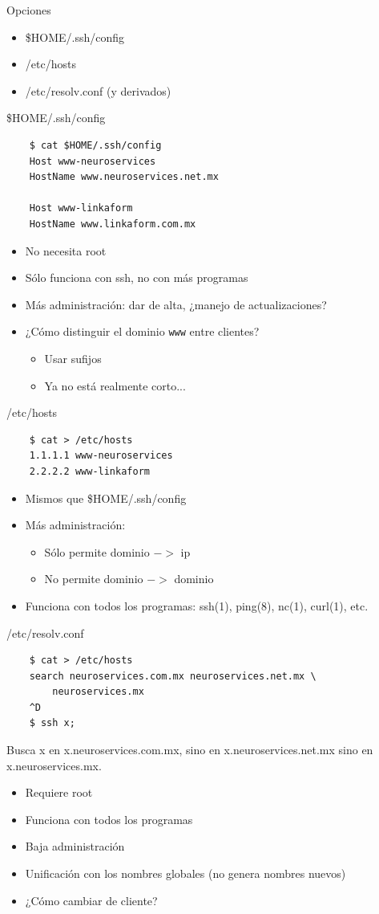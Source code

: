 \documentclass[11pt,spanish]{article}
\newcommand{\rowsp}[1][1em]{\vspace{#1}}
\newcommand{\hone}[1]{{\rowsp[0.3em]\noindent\Large #1 \rowsp[0.3em]}}
\newcommand{\myitm}[1]{\begin{itemize}#1\end{itemize}}
\newcommand{\pros}{\item[pros:]}
\newcommand{\cons}{\item[cons:]}
\begin{document}
\newpage %

\hone{Opciones}

\myitm{
	\item \$HOME/.ssh/config
	\item /etc/hosts
	\item /etc/resolv.conf (y derivados)
}

\newpage %

\hone{\$HOME/.ssh/config}

\begin{lstlisting}
	$ cat $HOME/.ssh/config
	Host www-neuroservices
	HostName www.neuroservices.net.mx

	Host www-linkaform
	HostName www.linkaform.com.mx
\end{lstlisting}

\myitm{
	\pros No necesita root
	\cons Sólo funciona con ssh, no con más programas
	\cons Más administración: dar de alta, ¿manejo de actualizaciones?
	\cons ¿Cómo distinguir el dominio \lstinline{www} entre clientes?
	\myitm{
		\item Usar sufijos
		\item Ya no está realmente corto...
	}
}

\newpage %

\hone{/etc/hosts}

\begin{lstlisting}
	$ cat > /etc/hosts
	1.1.1.1 www-neuroservices
	2.2.2.2 www-linkaform
\end{lstlisting}

\myitm{
	\cons Mismos que \$HOME/.ssh/config
	\cons Más administración:
	\myitm{
		\item Sólo permite dominio $->$ ip
		\item No permite dominio $->$ dominio
	}
	\pros Funciona con todos los programas: ssh(1), ping(8), nc(1), curl(1), etc.
}

\newpage %

\hone{/etc/resolv.conf}

\begin{lstlisting}
	$ cat > /etc/hosts
	search neuroservices.com.mx neuroservices.net.mx \
		neuroservices.mx
	^D
	$ ssh x;
\end{lstlisting}

Busca x en x.neuroservices.com.mx, sino en x.neuroservices.net.mx sino en
x.neuroservices.mx.

\myitm{
	\cons Requiere root
	\pros Funciona con todos los programas
	\pros Baja administración
	\pros Unificación con los nombres globales (no genera nombres nuevos)
	\item ¿Cómo cambiar de cliente?
}
\end{document}
